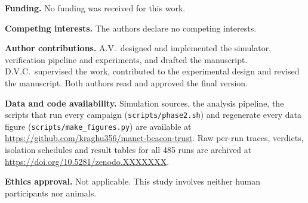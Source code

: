 \textbf{Funding.} No funding was received for this work.

\textbf{Competing interests.} The authors declare no competing interests.

\textbf{Author contributions.} A.V.\ designed and implemented the
simulator, verification pipeline and experiments, and drafted the
manuscript. D.V.C.\ supervised the work, contributed to the experimental
design and revised the manuscript. Both authors read and approved the final
version.

\textbf{Data and code availability.} Simulation sources, the analysis
pipeline, the scripts that run every campaign
(\texttt{scripts/phase2.sh}) and regenerate every data figure
(\texttt{scripts/make_figures.py}) are available at
\url{https://github.com/kraghu356/manet-beacon-trust}. Raw per-run traces,
verdicts, isolation schedules and result tables for all 485 runs are
archived at \url{https://doi.org/10.5281/zenodo.XXXXXXX}.

\textbf{Ethics approval.} Not applicable. This study involves neither human
participants nor animals.



